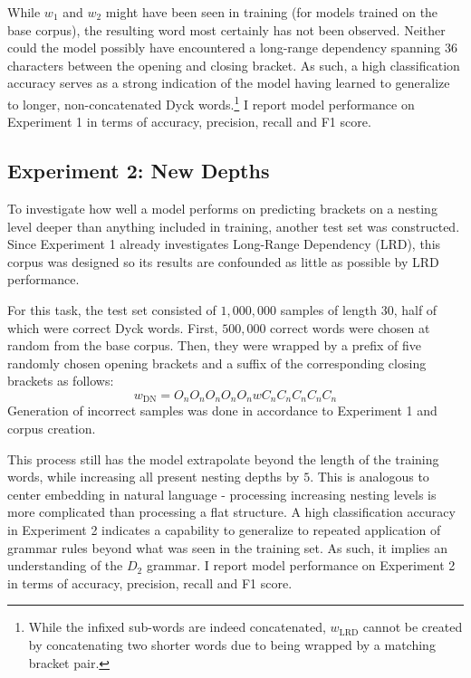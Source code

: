 While $w_{1}$ and $w_{2}$ might have been seen in training (for models trained on the base corpus), the resulting word most certainly has not been observed. Neither could the model possibly have encountered a long-range dependency spanning $36$ characters between the opening and closing bracket. As such, a high classification accuracy serves as a strong indication of the model having learned to generalize to longer, non-concatenated Dyck words.\footnote{While the infixed sub-words are indeed concatenated, $w_{\text{LRD}}$ cannot be created by concatenating two shorter words due to being wrapped by a matching bracket pair.} I report model performance on Experiment 1 in terms of accuracy, precision, recall and F1 score.

\subsection{Experiment 2: New Depths}\label{ND}
To investigate how well a model performs on predicting brackets on a nesting level deeper than anything included in training, another test set was constructed. Since Experiment 1 already investigates Long-Range Dependency (LRD), this corpus was designed so its results are confounded as little as possible by LRD performance.

For this task, the test set consisted of  $1{,}000{,}000$ samples of length $30$, half of which were correct Dyck words. First, $500,000$  correct words were chosen at random from the base corpus. Then, they were wrapped by a prefix of five randomly chosen opening brackets and a suffix of the corresponding closing brackets as follows:
\[
	w_{\text{DN}} = O_{n}O_{n}O_{n}O_{n}O_{n}wC_{n}C_{n}C_{n}C_{n}C_{n}
\]
Generation of incorrect samples was done in accordance to Experiment 1 and corpus creation.

This process still has the model extrapolate beyond the length of the training words, while increasing all present nesting depths by $5$. This is analogous to center embedding in natural language - processing increasing nesting levels is more complicated than processing a flat structure. A high classification accuracy in Experiment 2 indicates a capability to generalize to repeated application of grammar rules beyond what was seen in the training set. As such, it implies an understanding of the $D_{2}$ grammar. I report model performance on Experiment 2 in terms of accuracy, precision, recall and F1 score.